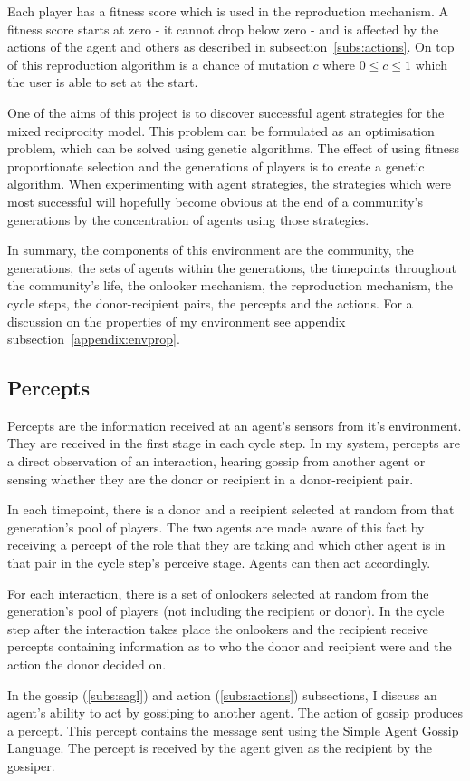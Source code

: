 \documentclass[]{final_report}
\begin{document}
Each player has a fitness score which is used in the reproduction mechanism. A fitness score starts at zero - it cannot drop below zero - and is affected by the actions of the agent and others as described in subsection~\ref{subs:actions}. On top of this reproduction algorithm is a chance of mutation $c$ where $0\le c\le 1$ which the user is able to set at the start.\par
One of the aims of this project is to discover successful agent strategies for the mixed reciprocity model. This problem can be formulated as an optimisation problem, which can be solved using genetic algorithms. The effect of using fitness proportionate selection and the generations of players is to create a genetic algorithm. When experimenting with agent strategies, the strategies which were most successful will hopefully become obvious at the end of a community's generations by the concentration of agents using those strategies.\par
In summary, the components of this environment are the community, the generations, the sets of agents within the generations, the timepoints throughout the community's life, the onlooker mechanism, the reproduction mechanism, the cycle steps, the donor-recipient pairs, the percepts and the actions. For a discussion on the properties of my environment see appendix subsection~\ref{appendix:envprop}.

\subsection{Percepts}
\label{subs:percepts}
Percepts are the information received at an agent's sensors from it's environment. They are received in the first stage in each cycle step. In my system, percepts are a direct observation of an interaction, hearing gossip from another agent or sensing whether they are the donor or recipient in a donor-recipient pair.\par
In each timepoint, there is a donor and a recipient selected at random from that generation's pool of players. The two agents are made aware of this fact by receiving a percept of the role that they are taking and which other agent is in that pair in the cycle step's perceive stage. Agents can then act accordingly.\par
For each interaction, there is a set of onlookers selected at random from the generation's pool of players (not including the recipient or donor). In the cycle step after the interaction takes place the onlookers and the recipient receive percepts containing information as to who the donor and recipient were and the action the donor decided on.\par
In the gossip (\ref{subs:sagl}) and action (\ref{subs:actions}) subsections, I discuss an agent's ability to act by gossiping to another agent. The action of gossip produces a percept. This percept contains the message sent using the Simple Agent Gossip Language. The percept is received by the agent given as the recipient by the gossiper.
\end{document}
